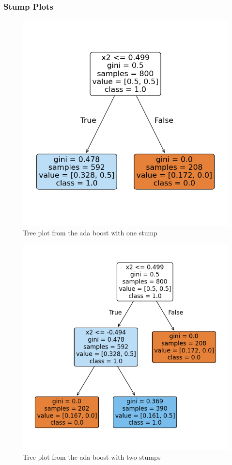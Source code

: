 \documentclass{article}
\begin{document}
\subsubsection*{Stump Plots}
\begin{center}
  \begin{figure}[H]
    \includegraphics{hw9_q7d_ada_stumps_1.png}
    \caption{Tree plot from the ada boost with one stump}
  \end{figure}
\end{center}

\begin{center}
  \begin{figure}[H]
    \includegraphics{hw9_q7d_ada_stumps_2.png}
    \caption{Tree plot from the ada boost with two stumps}
  \end{figure}
\end{center}
\end{document}
